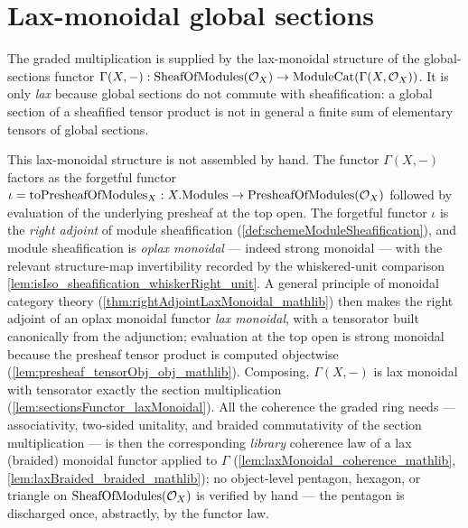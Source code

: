 \section{Lax-monoidal global sections}
\label{sec:sgr_lax_sections}

The graded multiplication is supplied by the lax-monoidal structure of the
global-sections functor \(\Gamma(X, -) : \mathrm{SheafOfModules}(\mathcal{O}_X) \to
\mathrm{ModuleCat}(\Gamma(X, \mathcal{O}_X))\). It is only \emph{lax} because
global sections do not commute with sheafification: a global section of a
sheafified tensor product is not in general a finite sum of elementary tensors of
global sections.

This lax-monoidal structure is not assembled by hand. The functor \(\Gamma(X,-)\)
factors as the forgetful functor
\(\iota = \mathrm{toPresheafOfModules}_X : X.\mathrm{Modules} \to \mathrm{PresheafOfModules}(\mathcal{O}_X)\)
followed by evaluation of the underlying presheaf at the top open. The forgetful
functor \(\iota\) is the \emph{right adjoint} of module sheafification
(\cref{def:schemeModuleSheafification}), and module sheafification is
\emph{oplax monoidal} --- indeed strong monoidal --- with the relevant
structure-map invertibility recorded by the whiskered-unit comparison
\cref{lem:isIso_sheafification_whiskerRight_unit}. A general principle of monoidal
category theory (\cref{thm:rightAdjointLaxMonoidal_mathlib}) then makes the right
adjoint of an oplax monoidal functor \emph{lax monoidal}, with a tensorator built
canonically from the adjunction; evaluation at the top open is strong monoidal
because the presheaf tensor product is computed objectwise
(\cref{lem:presheaf_tensorObj_obj_mathlib}). Composing, \(\Gamma(X,-)\) is lax
monoidal with tensorator exactly the section multiplication
(\cref{lem:sectionsFunctor_laxMonoidal}). All the coherence the graded ring needs
--- associativity, two-sided unitality, and braided commutativity of the section
multiplication --- is then the corresponding \emph{library} coherence law of a lax
(braided) monoidal functor applied to \(\Gamma\)
(\cref{lem:laxMonoidal_coherence_mathlib},
\cref{lem:laxBraided_braided_mathlib}); no object-level pentagon, hexagon, or
triangle on \(\mathrm{SheafOfModules}(\mathcal{O}_X)\) is verified by hand --- the pentagon is
discharged once, abstractly, by the functor law.

